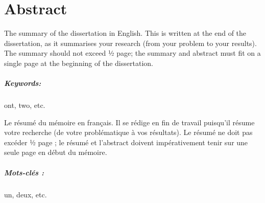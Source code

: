 \chapter*{Abstract}

\noindent The summary of the dissertation in English. This is written at the end of the dissertation, as it summarises your research (from your problem to your results). The summary should not exceed ½ page; the summary and abstract must fit on a single page at the beginning of the dissertation.

\paragraph*{Keywords:} ont, two, etc.

\bigskip

\noindent Le résumé du mémoire en français. Il se rédige en fin de travail puisqu'il résume votre recherche (de votre problématique à vos résultats). Le résumé ne doit pas excéder ½ page ; le résumé et l'abstract doivent impérativement tenir sur une seule page en début du mémoire.

\paragraph*{Mots-clés :} un, deux, etc.

